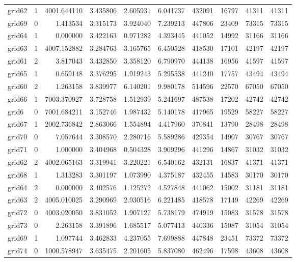\documentclass[../../../thesis.tex]{subfiles}
\begin{document}
\begin{longtable}{|l|r|r|r|r|r|r|r|r|r|}
grid62 & 1 & 4001.644110 & 3.435806 & 2.605931 & 6.041737 & 432091 & 16797 & 41311 & 41311 \\
grid69 & 0 & 1.413534 & 3.315173 & 3.924040 & 7.239213 & 447806 & 23409 & 73315 & 73315 \\
grid64 & 1 & 0.000000 & 3.422163 & 0.971282 & 4.393445 & 441052 & 14992 & 31166 & 31166 \\
grid63 & 1 & 4007.152882 & 3.284763 & 3.165765 & 6.450528 & 418530 & 17101 & 42197 & 42197 \\
grid61 & 2 & 3.817043 & 3.432850 & 3.358120 & 6.790970 & 444138 & 16956 & 41597 & 41597 \\
grid65 & 1 & 0.659148 & 3.376295 & 1.919243 & 5.295538 & 441240 & 17757 & 43494 & 43494 \\
grid60 & 2 & 1.263158 & 3.839977 & 6.140201 & 9.980178 & 514596 & 22570 & 67050 & 67050 \\
grid66 & 1 & 7003.370927 & 3.728758 & 1.512939 & 5.241697 & 487538 & 17202 & 42742 & 42742 \\
grid6 & 0 & 7001.684211 & 3.152746 & 1.987432 & 5.140178 & 417965 & 19529 & 58227 & 58227 \\
grid67 & 1 & 2002.736842 & 2.863066 & 1.554894 & 4.417960 & 370841 & 13790 & 28498 & 28498 \\
grid70 & 0 & 7.057644 & 3.308570 & 2.280716 & 5.589286 & 429354 & 14907 & 30767 & 30767 \\
grid71 & 0 & 1.000000 & 3.404968 & 0.504328 & 3.909296 & 441296 & 14867 & 31032 & 31032 \\
grid62 & 2 & 4002.065163 & 3.319941 & 3.220221 & 6.540162 & 432131 & 16837 & 41371 & 41371 \\
grid68 & 1 & 1.313283 & 3.301197 & 1.073990 & 4.375187 & 432455 & 14583 & 30170 & 30170 \\
grid64 & 2 & 0.000000 & 3.402576 & 1.125272 & 4.527848 & 441062 & 15002 & 31181 & 31181 \\
grid63 & 2 & 4005.010025 & 3.290969 & 2.930516 & 6.221485 & 418578 & 17149 & 42269 & 42269 \\
grid72 & 0 & 4003.020050 & 3.831052 & 1.907127 & 5.738179 & 474919 & 15083 & 31578 & 31578 \\
grid73 & 0 & 2.263158 & 3.391896 & 1.685517 & 5.077413 & 440336 & 15087 & 31054 & 31054 \\
grid69 & 1 & 1.097744 & 3.462833 & 4.237055 & 7.699888 & 447848 & 23451 & 73372 & 73372 \\
grid74 & 0 & 1000.578947 & 3.635475 & 2.201605 & 5.837080 & 462496 & 17598 & 43608 & 43608 \\

\end{longtable}
\end{document}
